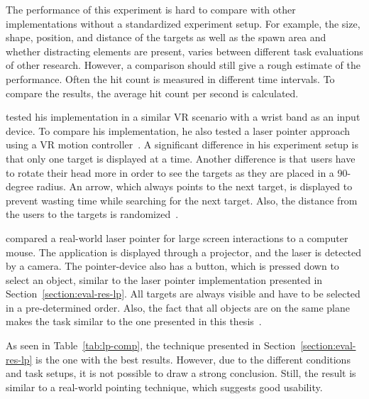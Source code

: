 The performance of this experiment is hard to compare with other implementations without a standardized experiment setup. For example, the size, shape, position, and distance of the targets as well as the spawn area and whether distracting elements are present, varies between different task evaluations of other research. However, a comparison should still give a rough estimate of the performance. Often the hit count is measured in different time intervals. To compare the results, the average hit count per second is calculated.

\citeauthor{Kamm.2018} tested his implementation in a similar \gls{VR} scenario with a wrist band as an input device. To compare his implementation, he also tested a laser pointer approach using a \gls{VR} motion controller~\cite[39]{Kamm.2018}. A significant difference in his experiment setup is that only one target is displayed at a time. Another difference is that users have to rotate their head more in order to see the targets as they are placed in a 90-degree radius. An arrow, which always points to the next target, is displayed to prevent wasting time while searching for the next target. Also, the distance from the users to the targets is randomized~\cite[45]{Kamm.2018}.

\citeauthor{JiYoungOh.2002} compared a real-world laser pointer for large screen interactions to a computer mouse. The application is displayed through a projector, and the laser is detected by a camera. The pointer-device also has a button, which is pressed down to select an object, similar to the laser pointer implementation presented in Section~\ref{section:eval-res-lp}. All targets are always visible and have to be selected in a pre-determined order. Also, the fact that all objects are on the same plane makes the task similar to the one presented in this thesis~\cite[3\psq]{JiYoungOh.2002}.

As seen in Table~\ref{tab:lp-comp}, the technique presented in Section~\ref{section:eval-res-lp} is the one with the best results. However, due to the different conditions and task setups, it is not possible to draw a strong conclusion. Still, the result is similar to a real-world pointing technique, which suggests good usability.

